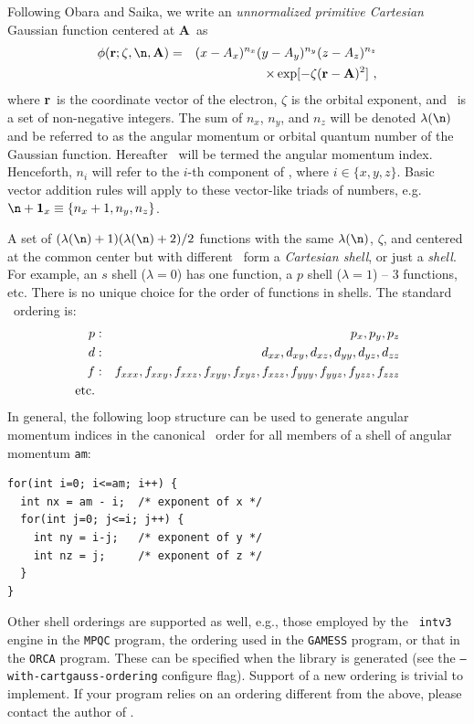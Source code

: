 \documentclass[10pt]{article}
\begin{document}
Following Obara and Saika,\cite{Obara86}
we write an {\em unnormalized primitive Cartesian} Gaussian function centered at {\bf A}\ as
\begin{eqnarray}
\phi ({\bf r}; \zeta, \n, {\bf A}) & = & (x - A_x)^{n_x} (y - A_y)^{n_y} (z - A_z)^{n_z} \nonumber \\
& & \times \exp [-\zeta({\bf r}-{\bf A})^2]\ ,
\end{eqnarray}
where {\bf r}\ is the coordinate vector of the electron, $\zeta$ is the orbital exponent, and
\n\ is a set of non-negative integers. The sum of $n_x$, $n_y$, and $n_z$ will be denoted $\lambda(\n)$
and be referred to as the angular momentum or orbital quantum number of the Gaussian function.
Hereafter \n\ will be termed the angular momentum index.
Henceforth, $n_i$ will refer to the $i$-th component of \n, where $i \in \{x, y, z\}$.
Basic vector addition rules will apply to these vector-like triads of numbers, e.g.
$\n + {\bf 1}_x \equiv \{ n_x+1, n_y, n_z\}$.

A set of $(\lambda(\n) + 1)(\lambda(\n) + 2)/2$ functions with the same $\lambda(\n)$, $\zeta$, and centered
at the common center
but with different \n\ form a {\em Cartesian shell},
or just a {\em shell}. For example, an $s$ shell ($\lambda=0$) has one function, a $p$ shell ($\lambda=1$) --
3 functions, etc.
There is no unique choice for the order of functions in shells.
The standard \LIBINT\ ordering is:
\begin{eqnarray}
p & : & p_x, p_y, p_z \nonumber \\
d & : & d_{xx}, d_{xy}, d_{xz}, d_{yy}, d_{yz}, d_{zz} \nonumber \\
f & : & f_{xxx}, f_{xxy}, f_{xxz}, f_{xyy}, f_{xyz}, f_{xzz}, f_{yyy}, f_{yyz}, f_{yzz}, f_{zzz} \nonumber \\
{\rm etc.} \nonumber
\end{eqnarray}
In general, the following loop structure can be used to generate angular momentum indices in the canonical \LIBINT\ order for all
members of a shell of angular momentum {\tt am}:
\begin{verbatim}
for(int i=0; i<=am; i++) {
  int nx = am - i;  /* exponent of x */
  for(int j=0; j<=i; j++) {
    int ny = i-j;   /* exponent of y */
    int nz = j;     /* exponent of z */
  }
}
\end{verbatim}
Other shell orderings are supported as well, e.g., those employed by the {\tt
intv3} engine in the {\tt MPQC} program, the ordering used in the {\tt GAMESS}
program, or that in the {\tt ORCA} program. These can be specified when the
library is generated (see the {\tt --with-cartgauss-ordering} configure flag).
Support of a new ordering is trivial to implement.
If your program relies on an ordering different from the above, please contact the author of \LIBINT .
\end{document}
